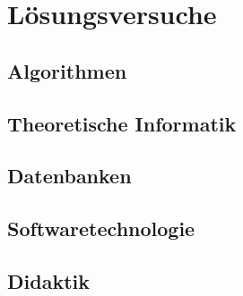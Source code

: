 \chapter{Lösungsversuche}
\section{Algorithmen}
\section{Theoretische Informatik}
\section{Datenbanken}
\section{Softwaretechnologie}
\section{Didaktik}

